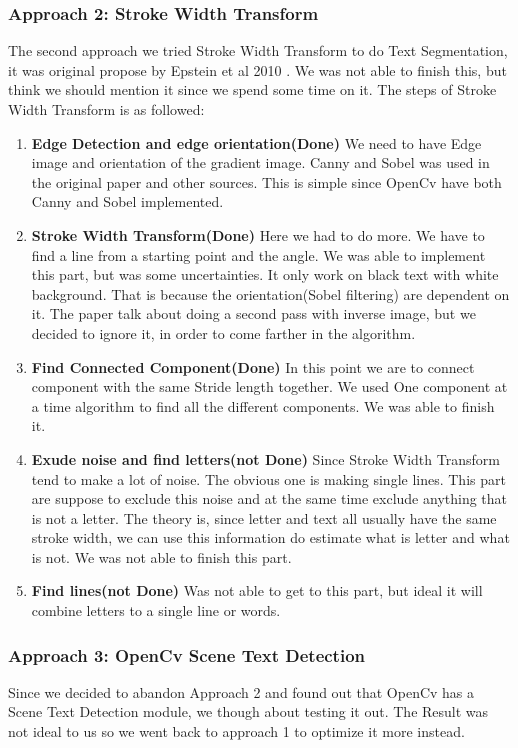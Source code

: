 \documentclass[11pt,a4paper,UKenglish]{article}
\begin{document}
\subsubsection{Approach 2: Stroke Width Transform}
The second approach we tried Stroke Width Transform to do Text Segmentation, it was original propose by Epstein et al 2010 \cite{epshtein_stroke_2010}. We was not able to finish this, but think we should mention it since we spend some time on it. The steps of Stroke Width Transform is as followed:
\begin{enumerate}
  \item \textbf{Edge Detection and edge orientation(Done)}
  We need to have Edge image and orientation of the gradient image. 
  Canny and Sobel was used in the original paper and other sources. This is simple since OpenCv have both Canny and Sobel implemented.
  \item \textbf{Stroke Width Transform(Done)}
  Here we had to do more. We have to find a line from a starting point and the angle. We was able to implement this part, but was some uncertainties. It only work on black text with white background. That is because the orientation(Sobel filtering) are dependent on it. The paper talk about doing a second pass with inverse image, but we decided to ignore it, in order to come farther in the algorithm. 
  \item \textbf{Find Connected Component(Done)}
  In this point we are to connect component with the same Stride length together. We used One component at a time algorithm to find all the different components. We was able to finish it. 
  \item \textbf{Exude noise and find letters(not Done)}
  Since Stroke Width Transform tend to make a lot of noise. The obvious one is making single lines. This part are suppose to exclude this noise and at the same time exclude anything that is not a letter. The theory is, since letter and text all usually have the same stroke width, we can use this information do estimate what is letter and what is not. We was not able to finish this part. 
  \item \textbf{Find lines(not Done)}
  Was not able to get to this part, but ideal it will combine letters to a single line or words. 
\end{enumerate}

\subsubsection{Approach 3: OpenCv Scene Text Detection}
Since we decided to abandon Approach 2 and found out that OpenCv has a Scene Text Detection module, we though about testing it out. The Result was not ideal to us so we went back to approach 1 to optimize it more instead. 
\end{document}
